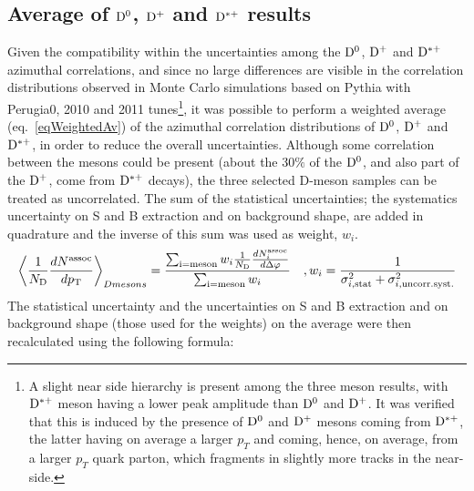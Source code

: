 \subsection{Average of ${\rm D^0}$, ${\rm D^+}$ and ${\rm D^{*+}}$ results}

%
%
%
%
Given the compatibility within the uncertainties among the ${\rm D^0}$, ${\rm D^+}$ and ${\rm D^{*+}}$ azimuthal correlations, and since no large differences are visible in the correlation distributions observed in Monte Carlo simulations based on Pythia with Perugia0, 2010 and 2011 tunes\footnote{A slight near side hierarchy is present among the three meson results, with ${\rm D^{*+}}$ meson having a lower peak amplitude than ${\rm D^0}$ and ${\rm D^+}$. It was verified that this is induced by the presence of ${\rm D^0}$ and ${\rm D^+}$ mesons coming from ${\rm D^{*+}}$, the latter having on average a larger $p_T$ and coming, hence, on average, from a larger $p_T$ quark parton, which fragments in slightly more tracks in the near-side.}, it was possible to perform a weighted average (eq.~\ref{eqWeightedAv}) of the azimuthal correlation distributions of ${\rm D^0}$, ${\rm D^+}$ and ${\rm D^{*+}}$, in order to reduce the overall uncertainties.
Although some correlation between the mesons could be present (about the 30$\%$ of the ${\rm D^0}$, and also part of the ${\rm D^+}$, come from ${\rm D^{*+}}$ decays), the three selected D-meson samples can be treated as uncorrelated. The sum of the statistical uncertainties; the systematics uncertainty on S and B extraction and on background shape, are added in quadrature and the inverse of this sum was used as weight, $w_i$.
\begin{equation}
  \left \langle \frac{1}{N_{\rm D}}\frac{dN^{\rm assoc}}{dp_{\rm T}} \right \rangle_{D mesons} =  \frac{\sum_{\rm i=meson}w_{i}\frac{1}{N_{\rm D}}\frac{dN^{\rm assoc}_{i}}{d\Delta\varphi}}{\sum_{\rm i=meson}w_{i}}\quad , w_{i}=\frac{1}{\sigma^{2}_{i, \rm stat}+\sigma^{2}_{i, \rm uncorr. syst.}}
\label{eqWeightedAv}
\end{equation}
The statistical uncertainty and the uncertainties on S and B extraction and on background shape (those used for the weights) on the average were then recalculated using the following formula:

